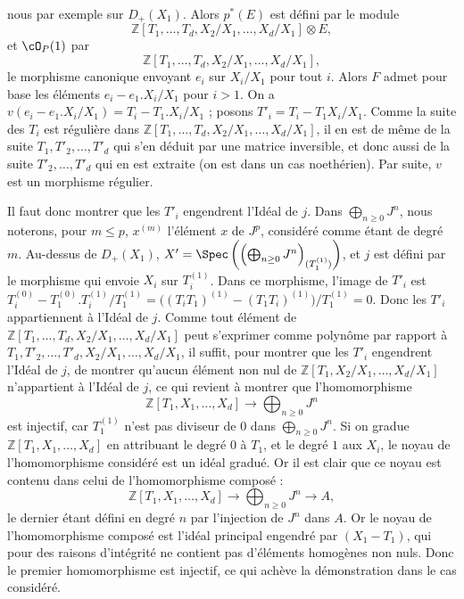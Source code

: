 nous par exemple sur \(D_+(X_1)\). Alors \(p^*(E)\) est défini par le module
\[
 \mathbb Z[T_1,\ldots,T_d,X_2/X_1,\ldots,X_d/X_1]\otimes E,
\]
et \(\cO_P(1)\) par
\[
 \mathbb Z[T_1,\ldots,T_d,X_2/X_1,\ldots,X_d/X_1],
\]
le morphisme canonique envoyant \(e_i\) sur \(X_i/X_1\) pour tout \(i\). Alors \(F\) admet pour base les éléments \(e_i-e_1.X_i/X_1\) pour \(i>1\).
On a \(v(e_i-e_1.X_i/X_1)=T_i-T_1.X_i/X_1\) ; posons \(T'_i=T_i-T_1X_i/X_1\).
Comme la suite des \(T_i\) est régulière dans \(\mathbb Z[T_1,\ldots,T_d,X_2/X_1,\ldots,X_d/X_1]\), il en est de même de la suite \(T_1,T'_2,\ldots,T'_d\) qui s'en déduit par une matrice inversible, et donc aussi de la suite \(T'_2,\ldots,T'_d\) qui en est extraite (on est dans un cas noethérien). Par suite, \(v\) est un morphisme régulier.

Il faut donc montrer que les \(T'_i\) engendrent l'Idéal de \(j\). Dans \(\bigoplus_{n\ge0}J^n\), nous noterons, pour \(m\le p\), \(x^{(m)}\) l'élément \(x\) de \(J^p\), considéré comme étant de degré \(m\). Au-dessus de \(D_+(X_1)\), \(X'=\Spec\left(\left(\bigoplus_{n\ge0}J^n\right)_{(T_1^{(1)})}\right)\), et \(j\) est défini par le morphisme qui envoie \(X_i\) sur \(T_i^{(1)}\). Dans ce morphisme, l'image de \(T'_i\) est \(T_i^{(0)}-T_1^{(0)}.T_i^{(1)}/T_1^{(1)}=\bigl((T_iT_1)^{(1)}-(T_1T_i)^{(1)}\bigr)/T_1^{(1)}=0\). Donc les \(T'_i\) appartiennent à l'Idéal de \(j\). Comme tout élément de \(\mathbb Z[T_1,\ldots,T_d,X_2/X_1,\ldots,X_d/X_1]\) peut s'exprimer comme polynôme par rapport à \(T_1,T'_2,\ldots,T'_d,X_2/X_1,\ldots,X_d/X_1\), il suffit, pour montrer que les \(T'_i\) engendrent l'Idéal de \(j\), de montrer qu'aucun élément non nul de \(\mathbb Z[T_1,X_2/X_1,\ldots,X_d/X_1]\) n'appartient à l'Idéal de \(j\), ce qui revient à montrer que l'homomorphisme
\[
\mathbb Z[T_1,X_1,\ldots,X_d]\longrightarrow\bigoplus_{n\ge0}J^n
\]
est injectif, car \(T_1^{(1)}\) n'est pas diviseur de 0 dans \(\bigoplus_{n\ge0}J^n\). Si on gradue \(\mathbb Z[T_1,X_1,\ldots,X_d]\) en attribuant le degré \(0\) à \(T_1\), et le degré \(1\) aux \(X_i\), le noyau de l'homomorphisme considéré est un idéal gradué. Or il est clair que ce
noyau est contenu dans celui de l'homomorphisme composé :
\[
\mathbb Z[T_1,X_1,\ldots,X_d]\longrightarrow
\bigoplus_{n\ge0}J^n\longrightarrow A,
\]
le dernier étant défini en degré \(n\) par l'injection de \(J^n\) dans \(A\). Or le noyau de l'homomorphisme composé est l'idéal principal engendré par \((X_1-T_1)\), qui pour des raisons d'intégrité ne contient pas d'éléments homogènes non nuls. Donc le premier homomorphisme est injectif, ce qui achève la démonstration dans le cas considéré.

